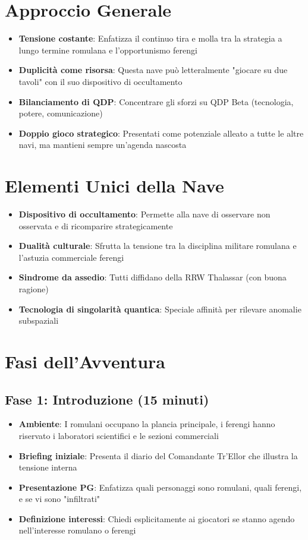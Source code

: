 \documentclass[letterpaper,twocolumn,openany,nodeprecatedcode]{dndbook}
\begin{document}
\section{Approccio Generale}

\begin{itemize}
    \item \textbf{Tensione costante}: Enfatizza il continuo tira e molla tra la strategia a lungo termine romulana e l'opportunismo ferengi
    \item \textbf{Duplicità come risorsa}: Questa nave può letteralmente "giocare su due tavoli" con il suo dispositivo di occultamento
    \item \textbf{Bilanciamento di QDP}: Concentrare gli sforzi su QDP Beta (tecnologia, potere, comunicazione)
    \item \textbf{Doppio gioco strategico}: Presentati come potenziale alleato a tutte le altre navi, ma mantieni sempre un'agenda nascosta
\end{itemize}

\section{Elementi Unici della Nave}

\begin{itemize}
    \item \textbf{Dispositivo di occultamento}: Permette alla nave di osservare non osservata e di ricomparire strategicamente
    \item \textbf{Dualità culturale}: Sfrutta la tensione tra la disciplina militare romulana e l'astuzia commerciale ferengi
    \item \textbf{Sindrome da assedio}: Tutti diffidano della RRW Thalassar (con buona ragione)
    \item \textbf{Tecnologia di singolarità quantica}: Speciale affinità per rilevare anomalie subspaziali
\end{itemize}

\section{Fasi dell'Avventura}
\subsection{Fase 1: Introduzione (15 minuti)
}

\begin{itemize}
    \item \textbf{Ambiente}: I romulani occupano la plancia principale, i ferengi hanno riservato i laboratori scientifici e le sezioni commerciali
    \item \textbf{Briefing iniziale}: Presenta il diario del Comandante Tr'Ellor che illustra la tensione interna
    \item \textbf{Presentazione PG}: Enfatizza quali personaggi sono romulani, quali ferengi, e se vi sono "infiltrati"
    \item \textbf{Definizione interessi}: Chiedi esplicitamente ai giocatori se stanno agendo nell'interesse romulano o ferengi
\end{itemize}
\end{document}
